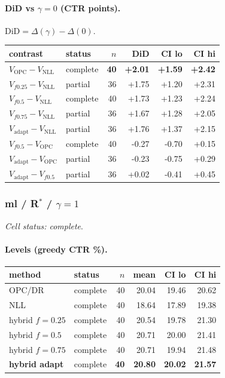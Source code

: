 \documentclass[10pt,a4paper]{article}
\begin{document}
\paragraph{DiD vs $\gamma=0$ (CTR points).} $\mathrm{DiD}=\Delta(\gamma)-\Delta(0)$.
{\centering\small\begin{tabular}{llrrrr}
\toprule contrast & status & $n$ & DiD & CI lo & CI hi \\
\midrule
\textbf{$V_{\mathrm{OPC}}-V_{\mathrm{NLL}}$} & complete & \textbf{40} & \textbf{+2.01} & \textbf{+1.59} & \textbf{+2.42} \\
$V_{f0.25}-V_{\mathrm{NLL}}$ & partial & 36 & +1.75 & +1.20 & +2.31 \\
$V_{f0.5}-V_{\mathrm{NLL}}$ & complete & 40 & +1.73 & +1.23 & +2.24 \\
$V_{f0.75}-V_{\mathrm{NLL}}$ & partial & 36 & +1.67 & +1.28 & +2.05 \\
$V_{\mathrm{adapt}}-V_{\mathrm{NLL}}$ & partial & 36 & +1.76 & +1.37 & +2.15 \\
$V_{f0.5}-V_{\mathrm{OPC}}$ & complete & 40 & -0.27 & -0.70 & +0.15 \\
$V_{\mathrm{adapt}}-V_{\mathrm{OPC}}$ & partial & 36 & -0.23 & -0.75 & +0.29 \\
$V_{\mathrm{adapt}}-V_{f0.5}$ & partial & 36 & +0.02 & -0.41 & +0.45 \\
\bottomrule\end{tabular}\par}
\bigskip
\subsubsection{ml / R$^*$ / $\gamma=1$}
\emph{Cell status: complete}.
\paragraph{Levels (greedy CTR \%).}
{\centering\small\begin{tabular}{llrrrr}
\toprule method & status & $n$ & mean & CI lo & CI hi \\
\midrule
OPC/DR & complete & 40 & 20.04 & 19.46 & 20.62 \\
NLL & complete & 40 & 18.64 & 17.89 & 19.38 \\
hybrid $f{=}0.25$ & complete & 40 & 20.54 & 19.78 & 21.30 \\
hybrid $f{=}0.5$ & complete & 40 & 20.71 & 20.00 & 21.41 \\
hybrid $f{=}0.75$ & complete & 40 & 20.71 & 19.94 & 21.48 \\
\textbf{hybrid adapt} & complete & \textbf{40} & \textbf{20.80} & \textbf{20.02} & \textbf{21.57} \\
\bottomrule\end{tabular}\par}
\end{document}
